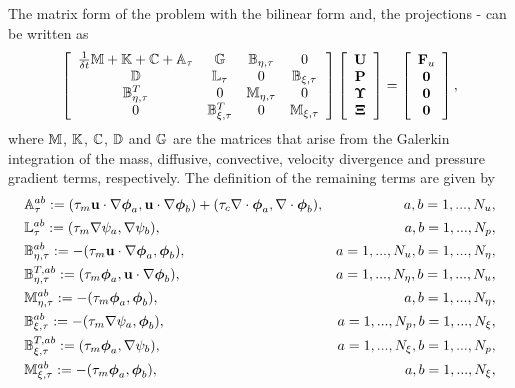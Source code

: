 The matrix form of the problem  with the bilinear form  and, the projections - can be written as
\begin{equation}
\label{eq-C5_NSmatform}
\left[\begin{array}{cccc}
\frac{1}{\delta t}\mathbb{M}+\mathbb{K}+\mathbb{C}+\mathbb{A}_\tau&\mathbb{G}&\mathbb{B}_{\eta,\tau}&0\\
\mathbb{D}&\mathbb{L}_\tau&0&\mathbb{B}_{\xi,\tau}\\
\mathbb{B}_{\eta,\tau}^T&0&\mathbb{M}_{\eta,\tau}&0\\
0&\mathbb{B}_{\xi,\tau}^T&0&\mathbb{M}_{\xi,\tau}
\end{array}\right]\left[\begin{array}{c}
{\bf U}\\
{\bf P}\\
\boldsymbol{\Upsilon}\\
{\boldsymbol{\Xi}}
\end{array}\right]=\left[\begin{array}{c}
{\bf F}_u\\
\mathbf{0}\\
\mathbf{0}\\
\mathbf{0}
\end{array}\right],
\end{equation}
where $\mathbb{M}$, $\mathbb{K}$, $\mathbb{C}$, $\mathbb{D}$ and $\mathbb{G}$ are the matrices that arise from the Galerkin integration of the mass, diffusive, convective, velocity divergence and pressure gradient terms, respectively. The definition of the remaining terms are given by
\begin{align*}
&\mathbb{A}_{\tau}^{ab}:=(\tau_m{\bf u}\cdot\nabla\boldsymbol{\phi}_{a},{\bf u}\cdot\nabla\boldsymbol{\phi}_{b})+(\tau_c\nabla\cdot\boldsymbol{\phi}_{a},\nabla\cdot\boldsymbol{\phi}_{b}),&a,b=1,...,N_u,\\
&\mathbb{L}_{\tau}^{ab}:=(\tau_m\nabla\psi_{a},\nabla\psi_{b}),&a,b=1,...,N_p,\\
&\mathbb{B}_{\eta,\tau}^{ab}:=-(\tau_m{\bf u}\cdot\nabla\boldsymbol{\phi}_{a},\boldsymbol{\phi}_{b}),&a=1,...,N_u,b=1,...,N_\eta,\\
&\mathbb{B}_{\eta,\tau}^{T,ab}:=(\tau_m\boldsymbol{\phi}_{a},{\bf u}\cdot\nabla\boldsymbol{\phi}_{b}),&a=1,...,N_\eta,b=1,...,N_u,\\
&\mathbb{M}_{\eta,\tau}^{ab}:=-(\tau_m\boldsymbol{\phi}_{a},\boldsymbol{\phi}_{b}),&a,b=1,...,N_\eta,\\
&\mathbb{B}_{\xi,\tau}^{ab}:=-(\tau_m\nabla\psi_{a},\boldsymbol{\phi}_{b}),&a=1,...,N_p,b=1,...,N_\xi,\\
&\mathbb{B}_{\xi,\tau}^{T,ab}:=(\tau_m\boldsymbol{\phi}_{a},\nabla\psi_{b}),&a=1,...,N_\xi,b=1,...,N_p,\\
&\mathbb{M}_{\xi,\tau}^{ab}:=-(\tau_m\boldsymbol{\phi}_{a},\boldsymbol{\phi}_{b}),&a,b=1,...,N_\xi,
\end{align*}
